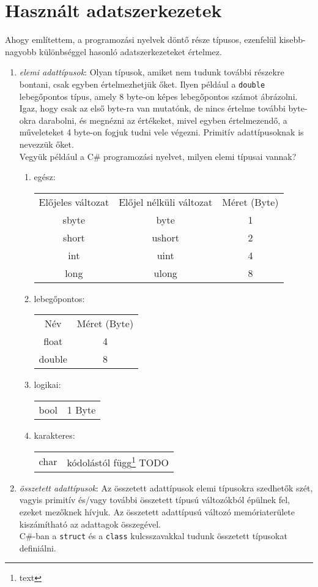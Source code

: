 \documentclass[tocnopagenum]{thesis-ekf}
\theoremstyle{definition}
\theoremstyle{remark}
\begin{document}
	\section{Használt adatszerkezetek}
	Ahogy említettem, a programozási nyelvek döntő része típusos, ezenfelül kisebb-nagyobb különbséggel hasonló adatszerkezeteket értelmez.
	\begin{enumerate}[label=\alph*)]
		\item \emph{elemi adattípusok}: Olyan típusok, amiket nem tudunk további részekre bontani, csak egyben értelmezhetjük őket. Ilyen például a \verb*|double| lebegőpontos típus, amely 8 byte-on képes lebegőpontos számot ábrázolni. Igaz, hogy csak az első byte-ra van mutatónk, de nincs értelme további byte-okra darabolni, és megnézni az értékeket, mivel egyben értelmezendő, a műveleteket 4 byte-on fogjuk tudni vele végezni. Primitív adattípusoknak is nevezzük őket.\\
		Vegyük például a C\# programozási nyelvet, milyen elemi típusai vannak?
			\begin{enumerate}
				\item egész:
				\begin{tabular}{ccc}
					Előjeles változat & Előjel nélküli változat & Méret (Byte) \\
					sbyte & byte & 1 \\
					short & ushort & 2 \\
					int & uint & 4 \\
					long & ulong & 8 \\
				\end{tabular}
				\item lebegőpontos:
				\begin{tabular}{cc}
					Név & Méret (Byte) \\
					float & 4 \\
					double & 8
				\end{tabular}
				\item logikai: 
				\begin{tabular}{cc}
					bool & 1 Byte
				\end{tabular}
				\item karakteres: 
				\begin{tabular}{cc}
					char & kódolástól függ\footnote{text} TODO
				\end{tabular}
			\end{enumerate}
	\item \emph{összetett adattípusok}: Az összetett adattípusok elemi típusokra szedhetők szét, vagyis primitív és/vagy további összetett típusú változókból épülnek fel, ezeket mezőknek hívjuk. Az összetett adattípusú változó memóriaterülete kiszámítható az adattagok összegével.\\
	C\#-ban a \verb*|struct| és a \verb*|class| kulcsszavakkal tudunk összetett típusokat definiálni.
	\end{enumerate}
\end{document}

